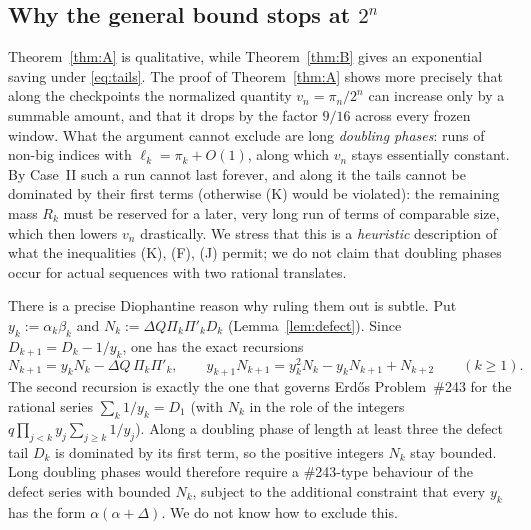 \documentclass[11pt]{amsart}
\theoremstyle{definition}
\theoremstyle{remark}
\begin{document}
\subsection{Why the general bound stops at $2^n$}
Theorem~\ref{thm:A} is qualitative, while Theorem~\ref{thm:B} gives an exponential
saving under \eqref{eq:tails}. The proof of Theorem~\ref{thm:A} shows more precisely
that along the checkpoints the normalized quantity $v_n=\pi_n/2^n$ can increase only
by a summable amount, and that it drops by the factor $9/16$ across every frozen
window. What the argument cannot exclude are long \emph{doubling phases}: runs of
non-big indices with $\ell_k=\pi_k+O(1)$, along which $v_n$ stays essentially constant.
By Case~II such a run cannot last forever, and along it the tails cannot be dominated
by their first terms (otherwise (K) would be violated): the remaining mass $R_k$ must
be reserved for a later, very long run of terms of comparable size, which then lowers
$v_n$ drastically. We stress that this is a \emph{heuristic} description of what the
inequalities (K), (F), (J) permit; we do not claim that doubling phases occur for
actual sequences with two rational translates.

There is a precise Diophantine reason why ruling them out is subtle. Put
$y_k:=\alpha_k\beta_k$ and $N_k:=\Delta Q\Pi_k\Pi'_kD_k$ (Lemma~\ref{lem:defect}).
Since $D_{k+1}=D_k-1/y_k$, one has the exact recursions
\[
N_{k+1}=y_kN_k-\Delta Q\,\Pi_k\Pi'_k,\qquad
y_{k+1}N_{k+1}=y_k^2N_k-y_kN_{k+1}+N_{k+2}\qquad(k\ge1).
\]
The second recursion is exactly the one that governs Erd\H{o}s Problem~\#243 for the
rational series $\sum_k1/y_k=D_1$ (with $N_k$ in the role of the integers
$q\prod_{j<k}y_j\sum_{j\ge k}1/y_j$). Along a doubling phase of length at least three
the defect tail $D_k$ is dominated by its first term, so the positive integers $N_k$
stay bounded. Long doubling phases would therefore require a \#243-type behaviour of
the defect series with bounded $N_k$, subject to the additional constraint that every
$y_k$ has the form $\alpha(\alpha+\Delta)$. We do not know how to exclude this.
\end{document}
